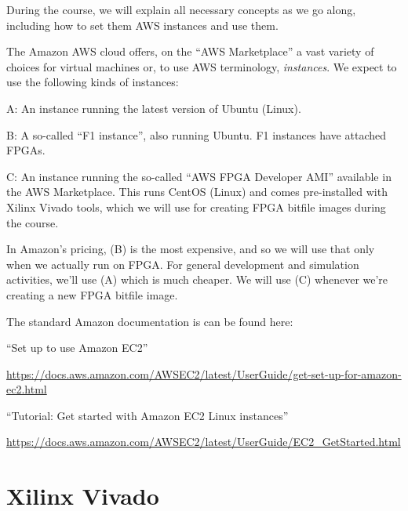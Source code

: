 During the course, we will explain all necessary concepts as we go
along, including how to set them AWS instances and use them.

The Amazon AWS cloud offers, on the ``AWS Marketplace'' a vast variety
of choices for virtual machines or, to use AWS terminology,
\emph{instances}.  We expect to use the following kinds of instances:

\begin{tightlist}

  \item[A:] An instance running the latest version of Ubuntu (Linux).

  \item[B:] A so-called ``F1 instance'', also running Ubuntu.  F1
    instances have attached FPGAs.

  \item[C:] An instance running the so-called ``AWS FPGA Developer
    AMI'' available in the AWS Marketplace.  This runs CentOS (Linux)
    and comes pre-installed with Xilinx Vivado tools, which we will
    use for creating FPGA bitfile images during the course.

\end{tightlist}

In Amazon's pricing, (B) is the most expensive, and so we will use
that only when we actually run on FPGA.  For general development and
simulation activities, we'll use (A) which is much cheaper.  We will
use (C) whenever we're creating a new FPGA bitfile image.

The standard Amazon documentation is can be found here:

\begin{tightlist}

  \item ``Set up to use Amazon EC2''

    \url{https://docs.aws.amazon.com/AWSEC2/latest/UserGuide/get-set-up-for-amazon-ec2.html}

  \item ``Tutorial: Get started with Amazon EC2 Linux instances''

    \url{https://docs.aws.amazon.com/AWSEC2/latest/UserGuide/EC2_GetStarted.html}

\end{tightlist}


\section{Xilinx Vivado}

